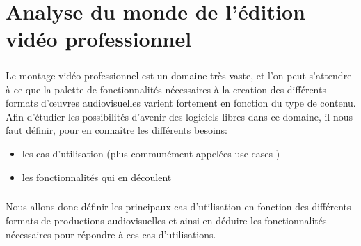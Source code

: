 \onehalfspacing
\chapter {Analyse du monde de l'édition vidéo professionnel}

\minitoc \mtcskip \newpage

\doublespace

\paragraph{}



Le montage vidéo professionnel est un domaine très vaste, et l'on
peut s'attendre à ce que la palette de fonctionnalités nécessaires
à la creation des différents formats d'œuvres audiovisuelles
varient fortement en fonction du type de contenu. Afin d'étudier les
possibilités d'avenir des logiciels libres dans ce domaine, il nous
faut définir, pour en connaître les différents besoins:

\begin{itemize} \setlength{\itemsep}{2mm}

  \item {les cas d'utilisation (plus communément appelées use cases
    )} 

  \item {les fonctionnalités qui en découlent}

\end{itemize}


\paragraph{}

Nous allons donc définir les principaux cas d'utilisation en fonction des
différents formats de productions audiovisuelles et ainsi en déduire les
fonctionnalités nécessaires pour répondre à ces cas d'utilisations.

\paragraph{}

